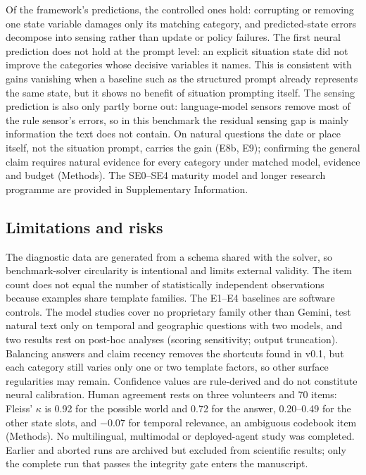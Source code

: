 Of the framework's predictions, the controlled ones hold: corrupting or removing
one state variable damages only its matching category, and predicted-state
errors decompose into sensing rather than update or policy failures. The first
neural prediction does not hold at the prompt level: an explicit situation state
did not improve the categories whose decisive variables it names. This is
consistent with gains vanishing when a baseline such as the structured prompt
already represents the same state, but it shows no benefit of situation
prompting itself. The
sensing prediction is also only partly borne out: language-model sensors
remove most of the rule sensor's errors, so in this benchmark the residual
sensing gap is mainly information the text does not contain. On natural
questions the date or place itself, not the situation prompt, carries the gain
(E8b, E9); confirming the general claim requires natural evidence for every
category under matched model, evidence and budget (Methods). The SE0--SE4
maturity model and longer research programme are provided in Supplementary
Information.

\subsection*{Limitations and risks}

The diagnostic data are generated from a schema shared with the solver, so
benchmark-solver circularity is intentional and limits external validity. The
item count does not equal the number of statistically independent observations
because examples share template
families. The E1--E4 baselines are software controls. The model studies cover
no proprietary family other than Gemini, test natural text only on temporal
and geographic questions with two models, and two results rest on post-hoc analyses (scoring
sensitivity; output truncation). Balancing
answers and claim recency removes the shortcuts found in v0.1, but each
category still varies only one or two template factors, so other surface
regularities may remain. Confidence
values are rule-derived and do not constitute neural calibration. Human
agreement rests on three volunteers and 70 items: Fleiss' $\kappa$ is 0.92 for
the possible world and 0.72 for the answer, 0.20--0.49 for the other state
slots, and $-0.07$ for temporal relevance, an ambiguous codebook item (Methods). No multilingual, multimodal or deployed-agent study was
completed. Earlier and aborted runs are archived but excluded from
scientific results; only the complete run that passes the integrity gate
enters the manuscript.

